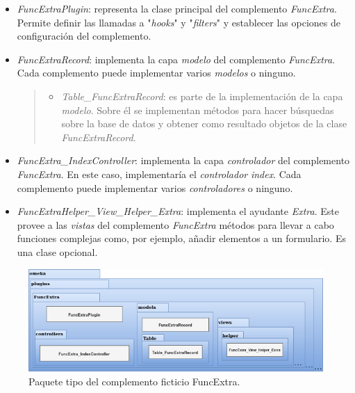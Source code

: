 \documentclass[
]{article}
\providecommand{\tightlist}{%
  \setlength{\itemsep}{0pt}\setlength{\parskip}{0pt}}
\begin{document}
\begin{itemize}
\item
  \emph{FuncExtraPlugin}: representa la clase principal del complemento
  \emph{FuncExtra}. Permite definir las llamadas a "\emph{hooks}" y
  "\emph{filters}" y establecer las opciones de configuración del
  complemento.
\item
  \emph{FuncExtraRecord}: implementa la capa \emph{modelo} del
  complemento \emph{FuncExtra}. Cada complemento puede implementar
  varios \emph{modelos} o ninguno.

  \begin{quote}
  \begin{itemize}
  \tightlist
  \item
    \emph{Table\_FuncExtraRecord}: es parte de la implementación de la
    capa \emph{modelo}. Sobre él se implementan métodos para hacer
    búsquedas sobre la base de datos y obtener como resultado objetos de
    la clase \emph{FuncExtraRecord}.
  \end{itemize}
  \end{quote}
\item
  \emph{FuncExtra\_IndexController}: implementa la capa
  \emph{controlador} del complemento \emph{FuncExtra}. En este caso,
  implementaría el \emph{controlador} \emph{index}. Cada complemento
  puede implementar varios \emph{controladores} o ninguno.
\item
  \emph{FuncExtraHelper\_View\_Helper\_Extra}: implementa el ayudante
  \emph{Extra}. Este provee a las \emph{vistas} del complemento
  \emph{FuncExtra} métodos para llevar a cabo funciones complejas como,
  por ejemplo, añadir elementos a un formulario. Es una clase opcional.
\end{itemize}

\begin{figure}
\hypertarget{da-pck-3}{%
\centering
\includegraphics{../_static/images/pck-3.png}
\caption{Paquete tipo del complemento ficticio
FuncExtra.}\label{da-pck-3}
}
\end{figure}
\end{document}
